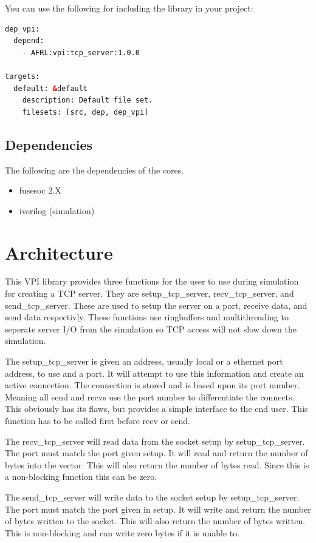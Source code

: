 You can use the following for including the library in your project:

\begin{lstlisting}[language=XML]
dep_vpi:
  depend:
    - AFRL:vpi:tcp_server:1.0.0

targets:
  default: &default
    description: Default file set.
    filesets: [src, dep, dep_vpi]
\end{lstlisting}

\subsection{Dependencies}

\par
The following are the dependencies of the cores.

\begin{itemize}
  \item fusesoc 2.X
  \item iverilog (simulation)
\end{itemize}



\section{Architecture}
\par
This VPI library provides three functions for the user to use during simulation for creating a TCP server. They are setup\_tcp\_server, recv\_tcp\_server, and send\_tcp\_server.
These are used to setup the server on a port, receive data, and send data respectivly. These functions use ringbuffers and multithreading to seperate server I/O from the simulation
so TCP access will not slow down the simulation.
\par
The setup\_tcp\_server is given an address, usually local or a ethernet port address, to use and a port. It will attempt to use this information and create an active connection.
The connection is stored and is based upon its port number. Meaning all send and recvs use the port number to differentiate the connects. This obviously has its flaws, but
provides a simple interface to the end user. This function has to be called first before recv or send.
\par
The recv\_tcp\_server will read data from the socket setup by setup\_tcp\_server. The port must match the port given setup. It will read and return the number of bytes into the vector.
This will also return the number of bytes read. Since this is a non-blocking function this can be zero.
\par
The send\_tcp\_server will write data to the socket setup by setup\_tcp\_server. The port must match the port given in setup. It will write and return the number of bytes written to the socket.
This will also return the number of bytes written. This is non-blocking and can write zero bytes if it is unable to.

